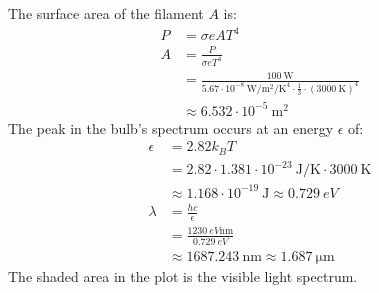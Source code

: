 \documentclass{article}
\begin{document}
The surface area of the filament $A$ is:
\begin{equation}
    \begin{split}
        P & = \sigma e AT^4 \\
        A & = \frac{P}{\sigma e T^4} \\
        & = \frac{100~\unit{\watt}}{5.67 \cdot 10^{-8}~\unit{\watt\per\meter\squared\per\kelvin\tothe{4}} \cdot \frac{1}{3} \cdot {\left(3000~\unit{\kelvin}\right)}^4} \\
        & \approx 6.532 \cdot 10^{-5}~\unit{\meter\squared}
    \end{split}
\end{equation}
The peak in the bulb's spectrum occurs at an energy $\epsilon$ of:
\begin{equation}
    \begin{split}
        \epsilon & = 2.82k_BT \\
        & = 2.82 \cdot 1.381 \cdot 10^{-23}~\unit{\joule\per\kelvin} \cdot 3000~\unit{\kelvin} \\
        & \approx 1.168 \cdot 10^{-19}~\unit{\joule} \approx 0.729~\unit{eV} \\
        \lambda & = \frac{hc}{\epsilon} \\
        & = \frac{1230~\unit{eV \nano\meter}}{0.729~\unit{eV}} \\
        & \approx 1687.243~\unit{\nano\meter} \approx 1.687~\unit{\micro\meter}
    \end{split}
\end{equation}
The shaded area in the plot is the visible light spectrum.
\begin{center}
\end{center}
\end{document}
